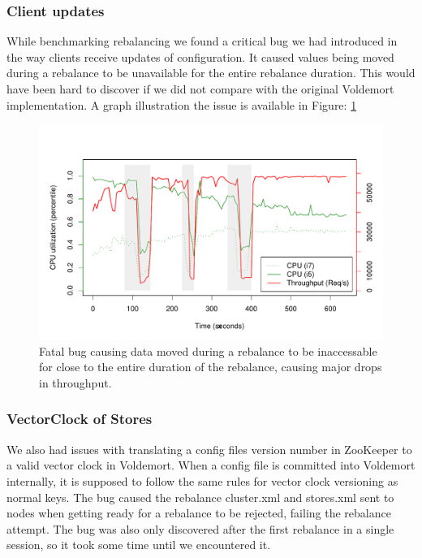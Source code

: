\subsubsection{Client updates}
While benchmarking rebalancing we found a critical bug we had introduced in the way clients receive updates of configuration. It caused values being moved during a rebalance to be unavailable for the entire rebalance duration. This would have been hard to discover if we did not compare with the original Voldemort implementation. A graph illustration the issue is available in Figure: \ref{fig:adaptive_bug}

\begin{figure}[h]
    \centering
    \includegraphics[width=1.0\textwidth]{results/throughput/adaptive/zookeeper/auto_2nodes_error}
    \caption{Fatal bug causing data moved during a rebalance to be inaccessable for close to the entire duration of the rebalance, causing major drops in throughput.}
    \label{fig:adaptive_bug}
\end{figure}

\subsubsection{VectorClock of Stores}
We also had issues with translating a config files version number in ZooKeeper to a valid vector clock in Voldemort. When a config file is committed into Voldemort internally, it is supposed to follow the same rules for vector clock versioning as normal keys.
The bug caused the rebalance cluster.xml and stores.xml sent to nodes when getting ready for a rebalance to be rejected, failing the rebalance attempt.
The bug was also only discovered after the first rebalance in a single session, so it took some time until we encountered it.

